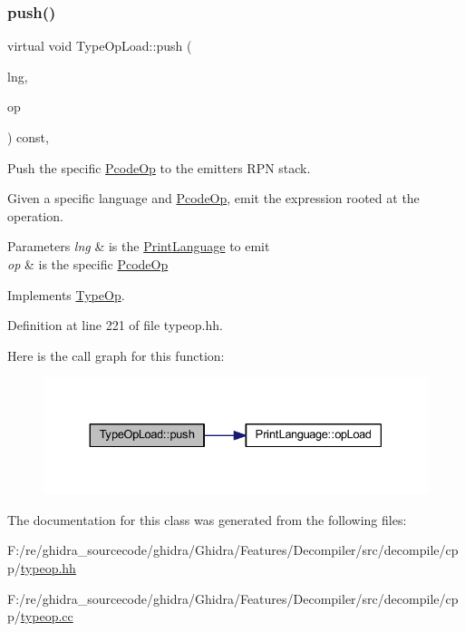 \subsubsection{\texorpdfstring{push()}{push()}}
{\footnotesize\ttfamily virtual void Type\+Op\+Load\+::push (\begin{DoxyParamCaption}\item[{\mbox{\hyperlink{class_print_language}{Print\+Language}} $\ast$}]{lng,  }\item[{const \mbox{\hyperlink{class_pcode_op}{Pcode\+Op}} $\ast$}]{op }\end{DoxyParamCaption}) const\hspace{0.3cm}{\ttfamily [inline]}, {\ttfamily [virtual]}}



Push the specific \mbox{\hyperlink{class_pcode_op}{Pcode\+Op}} to the emitter\textquotesingle{}s R\+PN stack. 

Given a specific language and \mbox{\hyperlink{class_pcode_op}{Pcode\+Op}}, emit the expression rooted at the operation. 
\begin{DoxyParams}{Parameters}
{\em lng} & is the \mbox{\hyperlink{class_print_language}{Print\+Language}} to emit \\
\hline
{\em op} & is the specific \mbox{\hyperlink{class_pcode_op}{Pcode\+Op}} \\
\hline
\end{DoxyParams}


Implements \mbox{\hyperlink{class_type_op_ac9c9544203ed74dabe6ac662b653b2af}{Type\+Op}}.



Definition at line 221 of file typeop.\+hh.

Here is the call graph for this function\+:
\nopagebreak
\begin{figure}[H]
\begin{center}
\leavevmode
\includegraphics[width=330pt]{class_type_op_load_a9352b52888c950ee3a9ca6d50014a23c_cgraph}
\end{center}
\end{figure}


The documentation for this class was generated from the following files\+:\begin{DoxyCompactItemize}
\item 
F\+:/re/ghidra\+\_\+sourcecode/ghidra/\+Ghidra/\+Features/\+Decompiler/src/decompile/cpp/\mbox{\hyperlink{typeop_8hh}{typeop.\+hh}}\item 
F\+:/re/ghidra\+\_\+sourcecode/ghidra/\+Ghidra/\+Features/\+Decompiler/src/decompile/cpp/\mbox{\hyperlink{typeop_8cc}{typeop.\+cc}}\end{DoxyCompactItemize}

